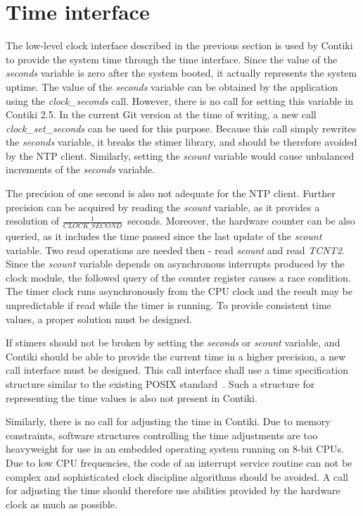 
\section{Time interface}\label{sec:analysis-time}
The low-level clock interface described in the previous section
is used by Contiki to provide the system time through the time interface.
Since the value of the {\it{seconds}} variable is zero after the system booted,
it actually represents the system uptime.
The value of the {\it{seconds}} variable can be obtained by the application using the {\it{clock\_seconds}} call.
However, there is no call for setting this variable in Contiki 2.5.
In the current Git version at the time of writing, a new call {\it{clock\_set\_seconds}}
can be used for this purpose.
Because this call simply rewrites the {\it{seconds}} variable, it breaks the stimer library,
and should be therefore avoided by the NTP client.
Similarly, setting the {\it{scount}} variable would cause
unbalanced increments of the {\it{seconds}} variable.

The precision of one second is also not adequate for the NTP client.
Further precision can be acquired by reading the {\it{scount}} variable,
as it provides a resolution of $\frac{1}{CLOCK\_SECOND}$~seconds.
Moreover, the hardware counter can be also queried, as it includes the time passed since
the last update of the {\it{scount}} variable.
Two read operations are needed then - read {\it{scount}} and read {\it{TCNT2}}.
Since the {\it{scount}} variable depends on asynchronous interrupts produced by
the clock module, the followed query of the counter register causes a race condition.
The timer clock runs asynchronously from the CPU clock and
the result may be unpredictable if read while the timer is running.
To provide consistent time values, a proper solution must be designed.

If stimers should not be broken by setting the {\it{seconds}} or {\it{scount}} variable,
and Contiki should be able to provide the current time in a higher precision,
a new call interface must be designed.
This call interface shall use a time specification structure similar
to the existing POSIX standard~\cite{posix}.
Such a structure for representing the time values is also not present in Contiki.

Similarly, there is no call for adjusting the time in Contiki.
Due to memory constraints, software structures controlling the time adjustments are too heavyweight
for use in an embedded operating system running on 8-bit CPUs.
Due to low CPU frequencies, the code of an interrupt service routine can not be complex
and sophisticated clock discipline algorithms should be avoided.
A call for adjusting the time should therefore use abilities
provided by the hardware clock as much as possible.

